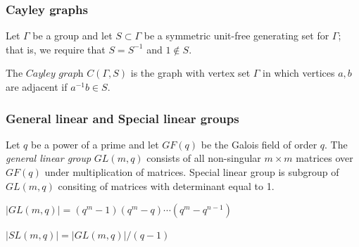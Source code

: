 \documentclass{beamer}
\begin{document}
\begin{frame}
	\frametitle{Cayley graphs}
	Let $\Gamma$ be a group and let $S\subset \Gamma$ be a symmetric unit-free generating set for $\Gamma$; that is, we require that $S=S^{-1}$ and $1\notin S$. 
	\begin{definition}
		The $\textit{Cayley graph}$ $C(\Gamma,S)$ is the graph with vertex set $\Gamma$ in which vertices $a,b$ are adjacent if $a^{-1}b\in S$. 		
	\end{definition}
\end{frame}
\begin{frame}
	\frametitle{General linear and Special linear groups}
		\begin{definition} Let $q$ be a power of a prime and let $GF(q)$ be the Galois field of order $q$. The {\em general linear group} $GL(m,q)$ consists of all non-singular $m\times m$ matrices over $GF(q)$ under multiplication of matrices.
		Special linear group is subgroup of $GL(m,q)$ consiting of matrices with determinant equal to 1.
		\end{definition}
		\begin{theorem}[Order of $GL(m,q)$]
			$|GL(m,q)| = (q^m - 1)(q^m - q) \cdots (q^m - q^{n-1})$
		\end{theorem}
		\begin{theorem}[Order of $SL(m,q)$]
			$|SL(m,q)| = |GL(m,q)|/(q-1)$
		\end{theorem}
\end{frame}
\end{document}
